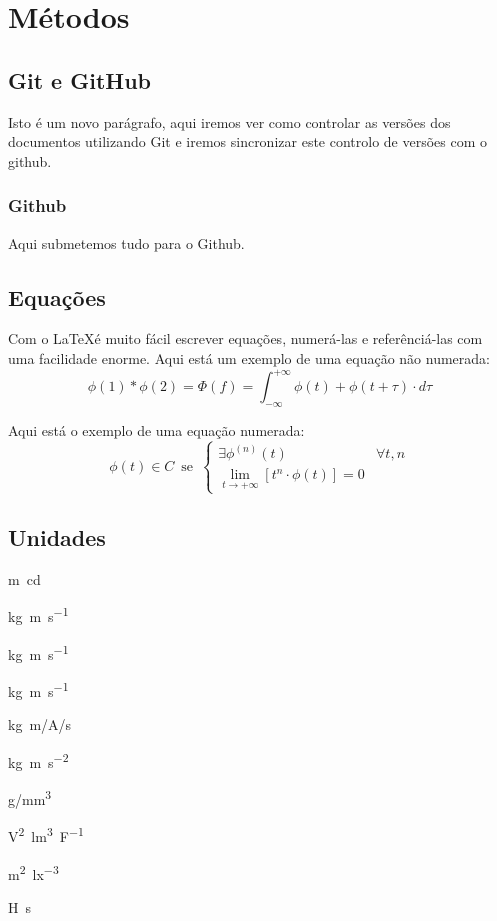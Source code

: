 \section{Métodos}\label{sec:metodos}

    \lipsum[6-7]

    \subsection{Git e GitHub}\label{subsec:outrometodo}

    Isto é um novo parágrafo, aqui iremos ver como controlar as versões dos documentos utilizando Git e iremos sincronizar este controlo de versões com o github.

    \subsubsection*{Github}

    Aqui submetemos tudo para o Github.

    \subsection{Equações}\label{subsec:equacoes}

    Com o \LaTeX é muito fácil escrever equações, numerá-las e referênciá-las com uma facilidade enorme.
    Aqui está um exemplo de uma equação não numerada:
    \[
        \phi(1) * \phi(2) = \Phi(f) = \int_{-\infty}^{+\infty}  \phi(t) + \phi(t+\tau) \cdot d\tau
    \]

    Aqui está o exemplo de uma equação numerada:
    \begin{equation}\label{eq:classe-c}
        \phi(t) \in C \, \text{ se } \,
        \begin{cases}
            \exists \phi^{(n)} (t) & \forall t,n \\
            \lim_{t \rightarrow +\infty} \left[t^n \cdot \phi(t)\right] = 0
        \end{cases}
    \end{equation}

    \subsection*{Unidades}

    \unit{\m\candela} \par
    \unit{kg.m.s^{-1}} \par
    \unit{\kilogram\metre\per\second} \par
    \unit{\kg\m\per\s} \par
    \unit[per-mode = symbol]{\kilogram\metre\per\ampere\per\second}\par
    \unit{\kilo\gram\metre\per\square\second} \par
    \unit[per-mode = symbol]{\gram\per\cubic\milli\metre} \par
    \unit{\square\volt\cubic\lumen\per\farad} \par
    \unit{\metre\squared\per\cubic\lux} \par
    \unit{\henry\second}

